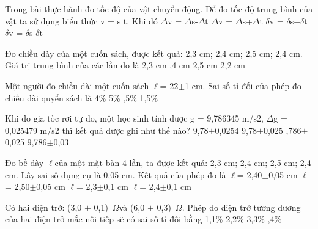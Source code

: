 \begin{ex} Trong bài thực hành đo tốc độ của vật chuyển động. Để đo tốc độ trung bình
của vật ta sử dụng biểu thức v = s
t. Khi đó
\choice
{$\Delta$v = $\Delta$s-$\Delta$t}
{$\Delta$v = $\Delta$s+$\Delta$t}
{\True $\delta$v = $\delta$s+$\delta$t}
{$\delta$v = $\delta$s-$\delta$t}
\loigiai{}
\end{ex}

\begin{ex} Đo chiều dày của một cuốn sách, được kết quả: 2,3 cm; 2,4 cm; 2,5 cm; 2,4 cm.
Giá trị trung bình của các lần đo là
\choice
{2,3 cm}
{,4 cm}
{2,5 cm}
{2,2 cm}
\loigiai{}
\end{ex}

\begin{ex} Một người đo chiều dài một cuốn sách $\ell$= 22$\pm$1 cm. Sai số tỉ đối của phép đo
chiều dài quyển sách là
\choice
{4\%}
{5\%}
{,5\%}
{1,5\%}
\loigiai{}
\end{ex}

\begin{ex} Khi đo gia tốc rơi tự do, một học sinh tính được g = 9,786345 m/s2, $\Delta$g =
0,025479 m/s2 thì kết quả được ghi như thế nào?
\choice
{9,78$\pm$0,0254}
{9,78$\pm$0,025}
{,786$\pm$0,025}
{9,786$\pm$0,03}
\loigiai{}
\end{ex}

\begin{ex} Đo bề dày $\ell$của một mặt bàn 4 lần, ta được kết quả: 2,3 cm; 2,4 cm; 2,5 cm;
2,4 cm. Lấy sai số dụng cụ là 0,05 cm. Kết quả của phép đo là
\choice
{$\ell$= 2,40$\pm$0,05 cm}
{$\ell$= 2,50$\pm$0,05 cm}
{$\ell$= 2,3$\pm$0,1 cm}
{\True $\ell$= 2,4$\pm$0,1 cm}
\loigiai{}
\end{ex}

\begin{ex} Có hai điện trở: (3,0 $\pm$ 0,1) \,$\Omega$và (6,0 $\pm$ 0,3) \,$\Omega$. Phép đo điện trở tương đương
của hai điện trở mắc nối tiếp sẽ có sai số tỉ đối bằng
\choice
{1,1\%}
{2,2\%}
{3,3\%}
{,4\%}
\end{ex}

